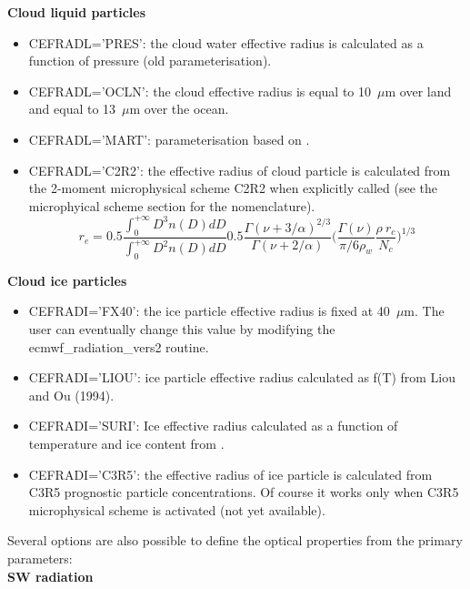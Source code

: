 {\bf Cloud liquid particles}\\
\begin{itemize}

\item CEFRADL='PRES': the cloud water effective radius is calculated as a function of pressure (old parameterisation).

\item CEFRADL='OCLN': the cloud effective radius is equal to 10~$\mu$m over land and equal to 13~$\mu$m over the ocean.

\item CEFRADL='MART': parameterisation based on \citet{Martin1994}.

        \item CEFRADL='C2R2': the effective radius of cloud particle is calculated from the 2-moment microphysical scheme C2R2 when explicitly called (see the microphyical scheme section for the nomenclature).
$$ r_{e}=0.5\frac{\int_0^{+\infty} D^3 n(D) dD}{\int_0^{+\infty} D^2 n(D) dD}0.5\frac{\Gamma(\nu+3/\alpha)^{2/3}}{\Gamma(\nu+2/\alpha)}\Big(\frac{\Gamma(\nu)}{\pi/6 \rho_w}\frac{\rho\ r_c}{N_c}\Big)^{1/3}$$
\end{itemize}

{\bf Cloud ice particles}\\
\begin{itemize}
\item CEFRADI='FX40': the ice particle effective radius is fixed at 40~$\mu$m. The user can eventually change this value by modifying the ecmwf\_radiation\_vers2 routine.

\item CEFRADI='LIOU': ice particle effective radius calculated as f(T) from Liou and Ou (1994).

\item CEFRADI='SURI': Ice effective radius calculated as a function of temperature and ice content from \citet{Sun1999}.

\item CEFRADI='C3R5': the effective radius of ice particle is calculated from C3R5 prognostic particle concentrations. Of course it works only when C3R5 microphysical scheme is activated (not yet available). \\
\end{itemize}

Several options are also possible to define the optical properties from the primary parameters: \\

{\bf SW radiation}\\

